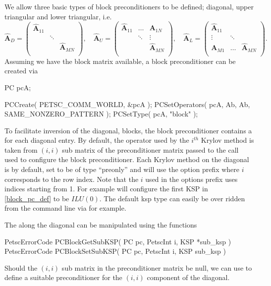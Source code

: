 \documentclass[10pt,a4paper]{amsart}
\newcommand{\m}[1]{\boldsymbol{#1}}		%
\newcommand{\code}[1]{{\fontfamily{txtt}\selectfont {#1}}}
\begin{document}
	We allow three basic types of block preconditioners to be defined; diagonal, upper triangular and lower triangular, i.e.
\begin{equation}
\hat{\m A}_D = 
\begin{pmatrix}
	\hat{\m A}_{11}		& 				& \\
					&\ddots			& \\
					&		 		&\hat{\m A}_{MN} \\
\end{pmatrix},  \quad
\hat{\m A}_U = 
\begin{pmatrix}
	\hat{\m A}_{11}		&\dots 		&\m A_{1N} \\
					&\ddots		&\vdots \\
					&		 	&\hat{\m A}_{MN} \\
\end{pmatrix}, \quad
\hat{\m A}_L = 
\begin{pmatrix}
	\hat{\m A}_{11}		& 			& \\
	\vdots			&\ddots		& \\
	\m A_{M1}		&\dots 		&\hat{\m A}_{MN} \\
\end{pmatrix}.
\label{block_pc_def}
\end{equation}
Assuming we have the block matrix \code{Ab} available, a block preconditioner can be created via
\begin{verbatimtab}[4]
	PC pcA;
	
	PCCreate( PETSC_COMM_WORLD, &pcA );
	PCSetOperators( pcA, Ab, Ab, SAME_NONZERO_PATTERN );
	PCSetType( pcA, "block" );
\end{verbatimtab}
To facilitate inversion of the diagonal, blocks, the block preconditioner contains a \code{KSP} for each diagonal entry. By default, the operator used by the $i^{th}$ Krylov method is taken from $(i,i)$ sub matrix of the preconditioner matrix passed to the call \code{PCSetOperators()} used to configure the block preconditioner. Each Krylov method on the diagonal is by default, set to be of type ``preonly'' and will use the option prefix  \code{pc\_block\_Qii} where $i$ corresponds to the row index. Note that the $i$ used in the options prefix uses indices starting from 1. For example \code{-pc\_block\_Q11\_pc\_type ilu} will configure the first KSP in \eqref{block_pc_def} to be $ILU(0)$. The default ksp type can easily be over ridden from the command line via \code{-pc\_block\_Q11\_ksp\_type cg} for example.

The \code{KSP} along the diagonal can be manipulated using the functions
\begin{verbatimtab}[4]
	PetscErrorCode PCBlockGetSubKSP( PC pc, PetscInt i, KSP *sub_ksp )
	PetscErrorCode PCBlockSetSubKSP( PC pc, PetscInt i, KSP sub_ksp )
\end{verbatimtab}
Should the $(i,i)$ sub matrix in the preconditioner matrix be null, we can use \code{PCBlockSetSubKSP()} to define a suitable preconditioner for the $(i,i)$ component of the diagonal.
\end{document}
